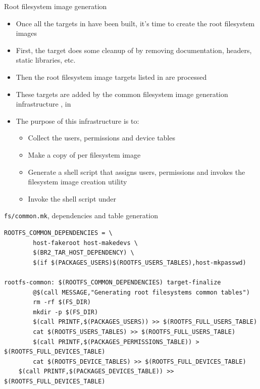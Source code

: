 \begin{frame}{Root filesystem image generation}
  \begin{itemize}
  \item Once all the targets in  have been built,
    it's time to create the root filesystem images
  \item First, the  target does some cleanup of
     by removing documentation, headers, static
    libraries, etc.
  \item Then the root filesystem image targets listed in
     are processed
  \item These targets are added by the common filesystem image
    generation infrastructure , in 
  \item The purpose of this infrastructure is to:
    \begin{itemize}
    \item Collect the users, permissions and device tables
    \item Make a copy of  per filesystem image
    \item Generate a shell script that assigns users, permissions and
      invokes the filesystem image creation utility
    \item Invoke the shell script under 
    \end{itemize}
  \end{itemize}
\end{frame}

\begin{frame}[fragile]{{\tt fs/common.mk}, dependencies and table generation}
  \begin{block}{}
\begin{verbatim}
ROOTFS_COMMON_DEPENDENCIES = \
        host-fakeroot host-makedevs \
        $(BR2_TAR_HOST_DEPENDENCY) \
        $(if $(PACKAGES_USERS)$(ROOTFS_USERS_TABLES),host-mkpasswd)

rootfs-common: $(ROOTFS_COMMON_DEPENDENCIES) target-finalize
        @$(call MESSAGE,"Generating root filesystems common tables")
        rm -rf $(FS_DIR)
        mkdir -p $(FS_DIR)
        $(call PRINTF,$(PACKAGES_USERS)) >> $(ROOTFS_FULL_USERS_TABLE)
        cat $(ROOTFS_USERS_TABLES) >> $(ROOTFS_FULL_USERS_TABLE)
        $(call PRINTF,$(PACKAGES_PERMISSIONS_TABLE)) > $(ROOTFS_FULL_DEVICES_TABLE)
        cat $(ROOTFS_DEVICE_TABLES) >> $(ROOTFS_FULL_DEVICES_TABLE)
	$(call PRINTF,$(PACKAGES_DEVICES_TABLE)) >> $(ROOTFS_FULL_DEVICES_TABLE)
\end{verbatim}
  \end{block}
\end{frame}

